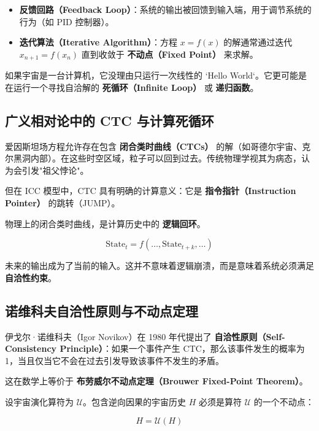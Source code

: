 \begin{itemize}
\item \textbf{反馈回路（Feedback Loop）}：系统的输出被回馈到输入端，用于调节系统的行为（如 PID 控制器）。

\item \textbf{迭代算法（Iterative Algorithm）}：方程 $x = f(x)$ 的解通常通过迭代 $x_{n+1} = f(x_n)$ 直到收敛于 \textbf{不动点（Fixed Point）} 来求解。
\end{itemize}

如果宇宙是一台计算机，它没理由只运行一次线性的 `Hello World`。它更可能是在运行一个寻找自洽解的 \textbf{死循环（Infinite Loop）} 或 \textbf{递归函数}。

\subsection{广义相对论中的 CTC 与计算死循环}

爱因斯坦场方程允许存在包含 \textbf{闭合类时曲线（CTCs）} 的解（如哥德尔宇宙、克尔黑洞内部）。在这些时空区域，粒子可以回到过去。传统物理学视其为病态，认为会引发"祖父悖论"。

但在 ICC 模型中，CTC 具有明确的计算意义：它是 \textbf{指令指针（Instruction Pointer）} 的跳转（JUMP）。

\begin{definition}[物理 CTC]
物理上的闭合类时曲线，是计算历史中的 \textbf{逻辑回环}。

\begin{equation}
\text{State}_{t} = f(\dots, \text{State}_{t+k}, \dots)
\end{equation}

未来的输出成为了当前的输入。这并不意味着逻辑崩溃，而是意味着系统必须满足 \textbf{自洽性约束}。
\end{definition}

\subsection{诺维科夫自洽性原则与不动点定理}

伊戈尔·诺维科夫（Igor Novikov）在 1980 年代提出了 \textbf{自洽性原则（Self-Consistency Principle）}：如果一个事件产生 CTC，那么该事件发生的概率为 1，当且仅当它不会在过去引发导致该事件不发生的矛盾。

这在数学上等价于 \textbf{布劳威尔不动点定理（Brouwer Fixed-Point Theorem）}。

\begin{theorem}[宇宙不动点]
设宇宙演化算符为 $\mathcal{U}$。包含逆向因果的宇宙历史 $H$ 必须是算符 $\mathcal{U}$ 的一个不动点：

\begin{equation}
H = \mathcal{U}(H)
\end{equation}
\end{theorem}

